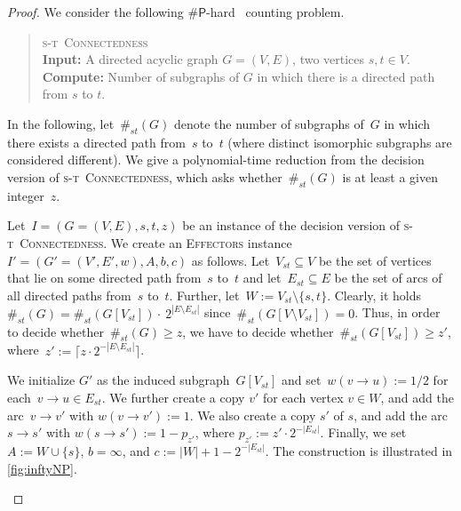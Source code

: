 \documentclass{article}
\newcommand{\p}{{\mathsf{P}}}
\newcommand{\probSharpDef}[3]{
  \begin{quote}
    #1 \\
    \textbf{Input:} #2 \\
    \textbf{Compute:} #3
  \end{quote}
}
\newcommand{\probSTConnectness}{\textsc{s-t~Connectedness}\xspace}
\newcommand{\probEffectors}{\textsc{Effectors}\xspace}
\begin{document}
\begin{proof}
  We consider the following $\#\p$-hard~\cite{VLG1979A} counting problem.
  \probSharpDef
    {\probSTConnectness}
    {A directed acyclic graph $G = (V, E)$, two vertices $s, t \in V$.}
    {Number of subgraphs of $G$ in which there is a directed path from $s$ to $t$.}
  
  In the following, let~$\#_{st}(G)$ denote the number of subgraphs
  of~$G$ in which there exists a directed path from~$s$ to~$t$ (where distinct isomorphic subgraphs are considered different).
  We give a polynomial-time reduction from the decision version of
  \probSTConnectness, which asks whether~$\#_{st}(G)$ is at least
  a given integer~$z$.
  
  Let~$I=(G=(V,E), s, t, z)$ be an instance of the decision version of \probSTConnectness.
  We create an \probEffectors instance $I'=(G' = (V', E', w), \allowbreak A, b, c)$
  as follows.
  Let~$V_{st}\subseteq V$ be the set of vertices that
  lie on some directed path from~$s$ to~$t$ and let~$E_{st}\subseteq
  E$ be the set of arcs of all directed paths from~$s$ to~$t$.
  Further, let~$W:=V_{st}\setminus \{s,t\}$.
  Clearly, it holds~$\#_{st}(G) = \#_{st}(G[V_{st}]) \cdot~2^{|E\setminus E_{st}|}$ since~$\#_{st}(G[V\setminus V_{st}])=0$.
  Thus, in order to decide whether~$\#_{st}(G) \geq z$, we have to
  decide whether~$\#_{st}(G[V_{st}]) \geq z'$, where~$z':=\lceil z\cdot
  2^{-|E\setminus E_{st}|}\rceil$.
  
  We initialize $G'$ as the induced subgraph~$G[V_{st}]$
  and set~$w(v\to u):=1/2$ for each~$v\to u\in E_{st}$.
  We further create a copy $v'$ for each vertex $v\in W$,
  and add the arc~$v\to v'$ with $w(v\to v'):=1$.
  We also create a copy $s'$ of $s$,
  and add the arc~$s\to s'$ with $w(s\to s'):=1-p_{z'}$, where $p_{z'} :=
  z'\cdot 2^{-|E_{st}|}$.
  Finally, we set $A:=W\cup\{s\}$, $b = \infty$, and $c := |W|+1-2^{-|E_{st}|}$.
  The construction is illustrated in \autoref{fig:inftyNP}.
  \begin{figure}[t]
    \centering
\end{figure}
\end{proof}
\end{document}
